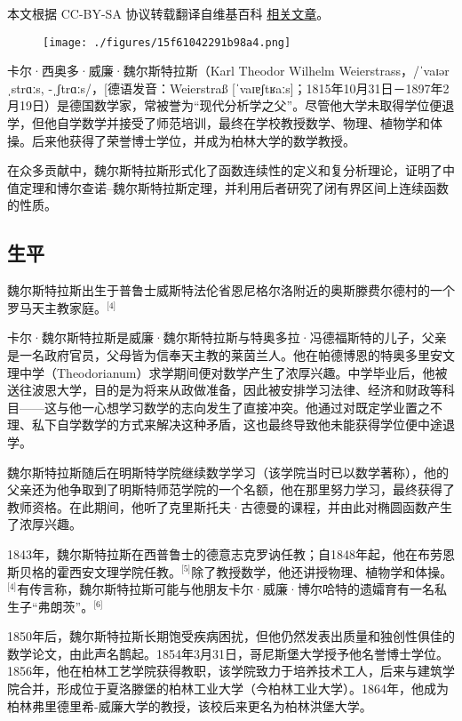 
本文根据 CC-BY-SA 协议转载翻译自维基百科 \href{https://en.wikipedia.org/wiki/Karl_Weierstrass}{相关文章}。

\begin{figure}[ht]
\centering
\texttt{[image: ./figures/15f61042291b98a4.png]}
\caption{} \label{fig_KRTS_1}
\end{figure}
卡尔·西奥多·威廉·魏尔斯特拉斯（Karl Theodor Wilhelm Weierstrass，/ˈvaɪərˌstrɑːs, -ˌʃtrɑːs/，[德语发音：Weierstraß [ˈvaɪɐʃtʁaːs]；1815年10月31日－1897年2月19日）是德国数学家，常被誉为“现代分析学之父”。尽管他大学未取得学位便退学，但他自学数学并接受了师范培训，最终在学校教授数学、物理、植物学和体操。后来他获得了荣誉博士学位，并成为柏林大学的数学教授。

在众多贡献中，魏尔斯特拉斯形式化了函数连续性的定义和复分析理论，证明了中值定理和博尔查诺–魏尔斯特拉斯定理，并利用后者研究了闭有界区间上连续函数的性质。
\subsection{生平}
魏尔斯特拉斯出生于普鲁士威斯特法伦省恩尼格尔洛附近的奥斯滕费尔德村的一个罗马天主教家庭。\(^\text{[4]}\)

卡尔·魏尔斯特拉斯是威廉·魏尔斯特拉斯与特奥多拉·冯德福斯特的儿子，父亲是一名政府官员，父母皆为信奉天主教的莱茵兰人。他在帕德博恩的特奥多里安文理中学（Theodorianum）求学期间便对数学产生了浓厚兴趣。中学毕业后，他被送往波恩大学，目的是为将来从政做准备，因此被安排学习法律、经济和财政等科目——这与他一心想学习数学的志向发生了直接冲突。他通过对既定学业置之不理、私下自学数学的方式来解决这种矛盾，这也最终导致他未能获得学位便中途退学。

魏尔斯特拉斯随后在明斯特学院继续数学学习（该学院当时已以数学著称），他的父亲还为他争取到了明斯特师范学院的一个名额，他在那里努力学习，最终获得了教师资格。在此期间，他听了克里斯托夫·古德曼的课程，并由此对椭圆函数产生了浓厚兴趣。

1843年，魏尔斯特拉斯在西普鲁士的德意志克罗讷任教；自1848年起，他在布劳恩斯贝格的霍西安文理学院任教。\(^\text{[5]}\)除了教授数学，他还讲授物理、植物学和体操。\(^\text{[4]}\)有传言称，魏尔斯特拉斯可能与他朋友卡尔·威廉·博尔哈特的遗孀育有一名私生子“弗朗茨”。\(^\text{[6]}\)

1850年后，魏尔斯特拉斯长期饱受疾病困扰，但他仍然发表出质量和独创性俱佳的数学论文，由此声名鹊起。1854年3月31日，哥尼斯堡大学授予他名誉博士学位。1856年，他在柏林工艺学院获得教职，该学院致力于培养技术工人，后来与建筑学院合并，形成位于夏洛滕堡的柏林工业大学（今柏林工业大学）。1864年，他成为柏林弗里德里希-威廉大学的教授，该校后来更名为柏林洪堡大学。

